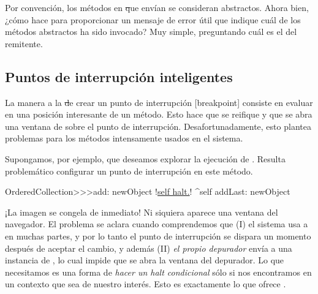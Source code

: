 \documentclass[a4paper,10pt,twoside]{book}
\begin{document}
Por convenci\'on, los m\'etodos en \st que env\'ian 
se consideran abstractos.  Ahora bien, ¿c\'omo
hace  para proporcionar un
mensaje de error \'util que indique cu\'al de los m\'etodos abstractos ha
sido invocado?  Muy simple, preguntando cu\'al es el 
del remitente.

 
\subsection{Puntos de interrupci\'on inteligentes}


La manera a la \st de crear un punto de interrupci\'on [breakpoint]
consiste en evaluar  en una posici\'on interesante de un
m\'etodo.  Esto hace que  se reifique y que se abra una
ventana de  sobre el punto de interrupci\'on.
Desafortunadamente, esto plantea problemas para los m\'etodos
intensamente usados en el sistema.

Supongamos, por ejemplo, que deseamos explorar la ejecuci\'on de
.  Resulta problem\'atico configurar un
punto de interrupci\'on en este m\'etodo.

\begin{code}{}
OrderedCollection>>>add: newObject
        !\underline{self halt.}!
        ^self addLast: newObject
\end{code}

¡La imagen se congela de inmediato!  Ni siquiera aparece una ventana
del navegador.  El problema se aclara cuando comprendemos que
(\textsc{I}) el sistema usa a  en muchas
partes, y por lo tanto el punto de interrupci\'on se dispara un momento
despu\'es de aceptar el cambio, y adem\'as (\textsc{II}) \emph{el propio
  depurador} env\'ia  a una instancia de
, lo cual impide que se abra la ventana del
depurador.  Lo que necesitamos es una forma de \emph{hacer un halt
  condicional} s\'olo si nos encontramos en un contexto que sea de
nuestro inter\'es.  Esto es exactamente lo que ofrece
.
\end{document}

